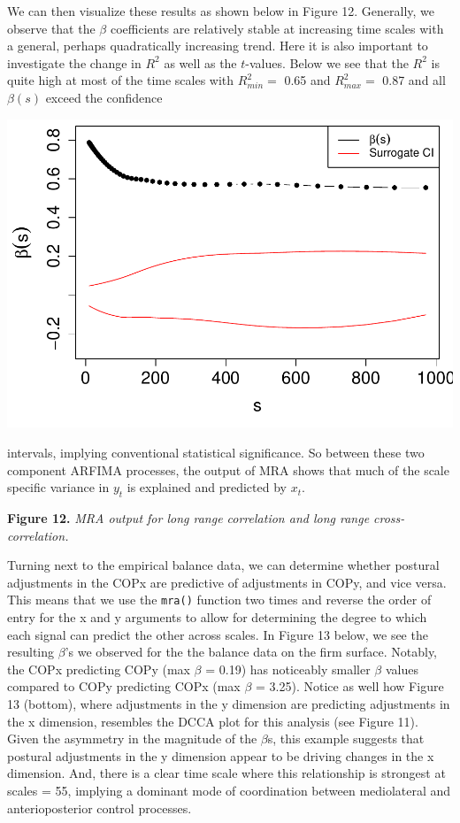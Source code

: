 \documentclass[
  man]{apa6}
\begin{document}
We can then visualize these results as shown below in Figure 12.
Generally, we observe that the \(\beta\) coefficients are relatively
stable at increasing time scales with a general, perhaps quadratically
increasing trend. Here it is also important to investigate the change in
\(R^2\) as well as the \(t\)-values. Below we see that the \(R^2\) is quite
high at most of the time scales with \(R^2_{min} =\)
0.65 and \(R^2_{max} =\)
0.87 and all \(\beta(s)\) exceed the confidence

\includegraphics{fractal_regression_paper_brm_files/figure-latex/unnamed-chunk-24-1.pdf}

intervals, implying conventional statistical significance. So between
these two component ARFIMA processes, the output of MRA shows that much
of the scale specific variance in \(y_t\) is explained and predicted by
\(x_t\).

\textbf{Figure 12.} \emph{MRA output for long range correlation and long range
cross-correlation.}

Turning next to the empirical balance data, we can determine whether
postural adjustments in the COPx are predictive of adjustments in COPy,
and vice versa. This means that we use the \texttt{mra()} function two times
and reverse the order of entry for the x and y arguments to allow for
determining the degree to which each signal can predict the other across
scales. In Figure 13 below, we see the resulting \(\beta\)'s we observed
for the the balance data on the firm surface. Notably, the COPx
predicting COPy (max \(\beta\) = 0.19) has
noticeably smaller \(\beta\) values compared to COPy predicting COPx (max
\(\beta\) = 3.25). Notice as well how Figure 13
(bottom), where adjustments in the y dimension are predicting
adjustments in the x dimension, resembles the DCCA plot for this
analysis (see Figure 11). Given the asymmetry in the magnitude of the
\(\beta\)s, this example suggests that postural adjustments in the y
dimension appear to be driving changes in the x dimension. And, there is
a clear time scale where this relationship is strongest at scales =
55, implying a
dominant mode of coordination between mediolateral and anterioposterior
control processes.
\end{document}
